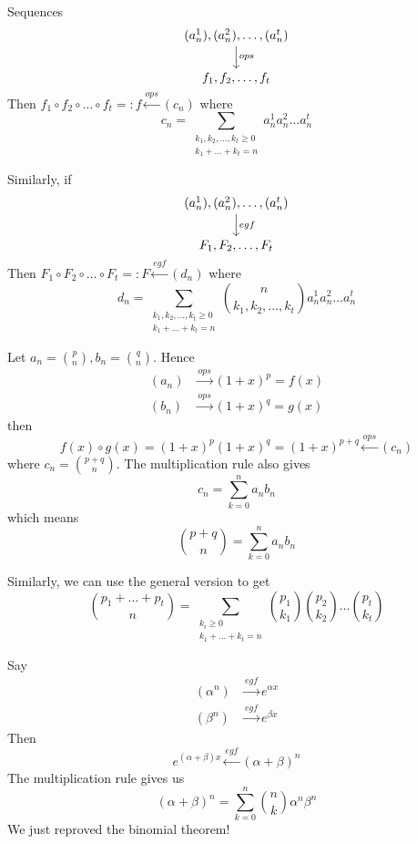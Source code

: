 \documentclass[12pt]{article}
\begin{document}
\begin{proposition}[Generalization]
    Sequences \[\begin{tikzcd}[ampersand replacement=\&,cramped]
        {(a_n^1),(a_n^2),\dots,(a_n^t)} \\
        {f_1,f_2,\dots,f_t}
        \arrow["ops", from=1-1, to=2-1]
    \end{tikzcd}\]
    Then $f_1\circ f_2\circ\dots\circ f_t=:f \xleftarrow{ops}(c_n)$
    where \[c_n=\sum_{\substack{k_1,k_2,\dots,k_t\geq 0\\ k_1+\dots+k_t=n}}a_n^1a_n^2\dots a_n^t\]

    Similarly, if \[\begin{tikzcd}[ampersand replacement=\&,cramped]
        {(a_n^1),(a_n^2),\dots,(a_n^t)} \\
        {F_1,F_2,\dots,F_t}
        \arrow["egf", from=1-1, to=2-1]
    \end{tikzcd}\]
    Then $F_1\circ F_2\circ\dots\circ F_t=:F \xleftarrow{egf}(d_n)$
    where \[d_n=\sum_{\substack{k_1,k_2,\dots,k_t\geq 0\\ k_1+\dots+k_t=n}}{n\choose k_1,k_2,\dots,k_t}a_n^1a_n^2\dots a_n^t\]
\end{proposition}

 Let $a_n={p\choose n}, b_n={q\choose n}$. Hence \begin{align*}
    (a_n)&\xrightarrow{ops}(1+x)^p = f(x)\\
    (b_n)&\xrightarrow{ops}(1+x)^q = g(x)
\end{align*}
then \[f(x)\circ g(x)= (1+x)^p(1+x)^q = (1+x)^{p+q}\xleftarrow{ops}(c_n)\]
where $c_n={p+q\choose n}$. The multiplication rule also gives \[c_n=\sum_{k=0}^{n}a_nb_n\]
which means \[{p+q\choose n} = \sum_{k=0}^{n}a_nb_n\]

Similarly, we can use the general version to get \[{p_1+\dots + p_t\choose n} = \sum_{\substack{k_i\geq 0\\ k_1+\dots+k_t=n}}{p_1\choose k_1}{p_2\choose k_2}\dots {p_t\choose k_t}\]

 Say \begin{align*}
    (\alpha^n)&\xrightarrow{egf}e^{\alpha x}\\
    (\beta^n)&\xrightarrow{egf}e^{\beta x}
\end{align*}
Then \[e^{(\alpha+\beta)x} \xleftarrow{egf}(\alpha+\beta)^n\]
The multiplication rule gives us \[(\alpha+\beta)^n= \sum_{k=0}^{n}{n\choose k}\alpha^n\beta^n\]
We just reproved the binomial theorem!
\end{document}
